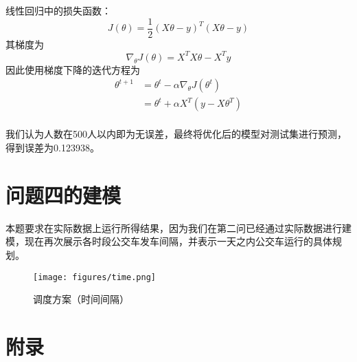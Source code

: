 \documentclass[UTF8]{ctexart}
\begin{document}
	线性回归中的损失函数：
	\begin{equation}
	J(\theta)=\frac{1}{2}(X\theta-y)^T(X\theta-y)
	\end{equation}
	其梯度为
	\begin{equation}
	\nabla_{\theta}J(\theta)=X^TX\theta-X^Ty 
	\end{equation}
	因此使用梯度下降的迭代方程为
	\begin{equation}
	\begin{aligned}
	\theta^{t+1}&=\theta^t-\alpha \nabla_{\theta}J(\theta^t)\\
	& =\theta^t+\alpha X^T(y-X\theta^T)\\
	\end{aligned}
	\end{equation}
	
	我们认为人数在500人以内即为无误差，最终将优化后的模型对测试集进行预测，得到误差为0.123938。
	
	\section{问题四的建模}
	本题要求在实际数据上运行所得结果，因为我们在第二问已经通过实际数据进行建模，现在再次展示各时段公交车发车间隔，并表示一天之内公交车运行的具体规划。
	
	\begin{figure}[H]
		\centering
		\texttt{[image: figures/time.png]}
		\caption {调度方案（时间间隔）}
	\end{figure}
	
	
	\newpage
	\section*{附录}	
\end{document}
